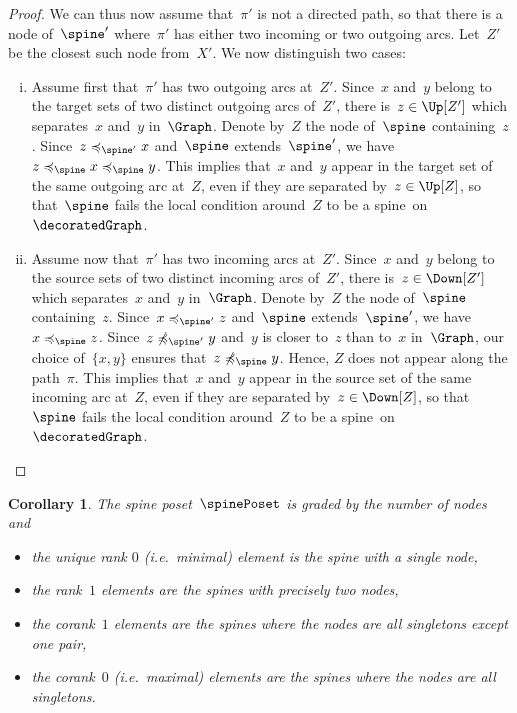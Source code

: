 \documentclass{amsart}
\newtheorem{corollary}[theorem]{Corollary}
\theoremstyle{definition}
\newcommand{\ie}{\textit{i.e.}~} %
\begin{document}
\begin{proof}
  We can thus now assume that~$\pi'$ is not a directed path, so that there is a node of~$\spine'$ where~$\pi'$ has either two incoming or two outgoing arcs.
  Let~$Z'$ be the closest such node from~$X'$.
  We now distinguish two cases:
  \begin{enumerate}[(i)]
    \item Assume first that~$\pi'$ has two outgoing arcs at~$Z'$.
    Since~$x$ and~$y$ belong to the target sets of two distinct outgoing arcs of~$Z'$, there is~$z \in \Up[Z']$ which separates~$x$ and~$y$ in~$\Graph$.
    Denote by~$Z$ the node of~$\spine$ containing~$z$.
    Since~$z \preccurlyeq_{\spine'} x$ and~$\spine$ extends~$\spine'$, we have~$z \preccurlyeq_{\spine} x \preccurlyeq_{\spine} y$.
    This implies that~$x$ and~$y$ appear in the target set of the same outgoing arc at~$Z$, even if they are separated by~$z \in \Up[Z]$, so that~$\spine$ fails the local condition around~$Z$ to be a spine~on~$\decoratedGraph$.
    \item Assume now that~$\pi'$ has two incoming arcs at~$Z'$.
    Since~$x$ and~$y$ belong to the source sets of two distinct incoming arcs of~$Z'$, there is~$z \in \Down[Z']$ which separates~$x$ and~$y$ in~$\Graph$.
    Denote by~$Z$ the node of~$\spine$ containing~$z$.
    Since~$x \preccurlyeq_{\spine'} z$ and~$\spine$ extends~$\spine'$, we have~$x \preccurlyeq_{\spine} z$.
    Since~$z \not\preccurlyeq_{\spine'} y$ and~$y$ is closer to~$z$ than to~$x$ in~$\Graph$, our choice of~$\{x,y\}$ ensures that~$z \not\preccurlyeq_{\spine} y$.
    Hence, $Z$ does not appear along the path~$\pi$.
    This implies that~$x$ and~$y$ appear in the source set of the same incoming arc at~$Z$, even if they are separated by~$z \in \Down[Z]$, so that~$\spine$ fails the local condition around~$Z$ to be a spine~on~$\decoratedGraph$.
    \qedhere
  \end{enumerate}
\end{proof}

\begin{corollary} 
  The spine poset~$\spinePoset$ is graded by the number of nodes and
  \begin{itemize}
    \item the unique rank $0$ (\ie minimal) element is the spine with a single node, 
    \item the rank~$1$ elements are the spines with precisely two nodes, 
    \item the corank~$1$ elements are the spines where the nodes are all singletons except one pair,
    \item the corank~$0$ (\ie maximal) elements are the spines where the nodes are all singletons.
  \end{itemize}
\end{corollary}
\end{document}

